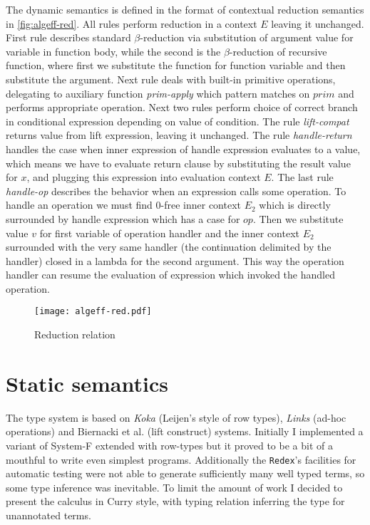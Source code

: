 \documentclass[inz, english, shortabstract]{iithesis}
\begin{document}
The dynamic semantics is defined in the format of contextual reduction semantics in \autoref{fig:algeff-red}.
All rules perform reduction in a context $ E $ leaving it unchanged.
First rule describes standard $ \beta $-reduction via substitution of argument value for variable in function body, while the second is the $ \beta $-reduction of recursive function, where first we substitute the function for function variable and then substitute the argument.
Next rule deals with built-in primitive operations, delegating to auxiliary function \textit{prim-apply} which pattern matches on $ prim $ and performs appropriate operation.
Next two rules perform choice of correct branch in conditional expression depending on value of condition.
The rule \textit{lift-compat} returns value from lift expression, leaving it unchanged.
The rule \textit{handle-return} handles the case when inner expression of handle expression evaluates to a value, which means we have to evaluate return clause by substituting the result value for $ x $, and plugging this expression into evaluation context $ E $.
The last rule \textit{handle-op} describes the behavior when an expression calls some operation.
To handle an operation we must find $0$-free inner context $ E_2 $ which is directly surrounded by handle expression which has a case for $ op $.
Then we substitute value $ v $ for first variable of operation handler and the inner context $ E_2 $ surrounded with the very same handler (the continuation delimited by the handler) closed in a lambda for the second argument.
This way the operation handler can resume the evaluation of expression which invoked the handled operation.

\begin{figure}
  \centering
  \texttt{[image: algeff-red.pdf]}
  \caption{Reduction relation} 
  \label{fig:algeff-red}
\end{figure} 

\section{Static semantics}
The type system is based on \emph{Koka}\cite{Leijen2014} (Leijen's style of row types\cite{Leijen2005}), \emph{Links}\cite{Hillerstrom2016} (ad-hoc operations) and Biernacki et al. \cite{Biernacki2017} (lift construct) systems.
Initially I implemented a variant of System-F extended with row-types but it proved to be a bit of a mouthful to write even simplest programs.
Additionally the \texttt{Redex}'s facilities for automatic testing were not able to generate sufficiently many well typed terms, so some type inference was inevitable.
To limit the amount of work I decided to present the calculus in Curry style, with typing relation inferring the type for unannotated terms.
\end{document}
